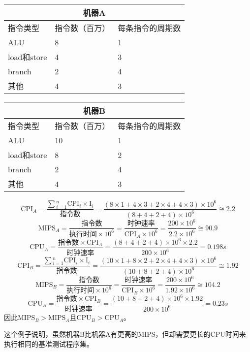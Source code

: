 \begin{table}[htbp]
\centering
\begin{tabular}{|l|l|l|}
\hline
\multicolumn{3}{|c|}{机器A}			\\
\hline
指令类型	& 指令数（百万）	& 每条指令的周期数\\
\hline
ALU		& 8			& 1		\\
\hline
load和store	& 4			& 3		\\
\hline
branch		& 2			& 4		\\
\hline
其他		& 4			& 3		\\
\hline
\end{tabular}
\end{table}

\begin{table}[htbp]
\centering
\begin{tabular}{|l|l|l|}
\hline
\multicolumn{3}{|c|}{机器B}			\\
\hline
指令类型	& 指令数（百万）	& 每条指令的周期数\\
\hline
ALU		& 10			& 1		\\
\hline
load和store	& 8			& 2		\\
\hline
branch		& 2			& 4		\\
\hline
其他		& 4			& 3		\\
\hline
\end{tabular}
\end{table}

$$\text{CPI}_A=\frac{\sum{}^n_{i=1}\text{CPI}_i\times \text{I}_i}{\text{指令数}}=\frac{(8\times1+4\times3+2\times4+4\times3)\times 10^6}{(8+4+2+4)\times10^6}\cong 2.2$$
$$\text{MIPS}_A=\frac{\text{指令数}}{\text{执行时间}\times \text{10}^6}=\frac{\text{时钟速率}}{\text{CPI}_A\times \text{10}^6}=\frac{200\times 10^6}{2.2\times 10^6}\cong90.9$$
$$\text{CPU}_A=\frac{\text{指令数}\times \text{CPI}_A}{\text{时钟速率}}=\frac{(8+4+2+4)\times 10^6\times 2.2}{200\times10^6}=0.198s$$
$$\text{CPI}_B=\frac{\sum{}^n_{i=1}\text{CPI}_i\times \text{I}_i}{\text{指令数}}=\frac{(10\times1+8\times2+2\times4+4\times3)\times 10^6}{(10+8+2+4)\times 10^6}\cong 1.92$$
$$\text{MIPS}_B=\frac{\text{指令数}}{\text{执行时间}\times \text{10}^6}=\frac{\text{时钟速率}}{\text{CPI}_B\times \text{10}^6}=\frac{200\times 10^6}{1.92\times 10^6}\cong104.2$$
$$\text{CPU}_B=\frac{\text{指令数}\times \text{CPI}_B}{\text{时钟速率}}=\frac{(10+8+2+4)\times 10^6\times 1.92}{200\times10^6}=0.23s$$
因此$\text{MIPS}_B>\text{MIPS}_A$且$\text{CPU}_B>\text{CPU}_A$。

这个例子说明，虽然机器B比机器A有更高的MIPS，但却需要更长的CPU时间来执行相同的基准测试程序集。

